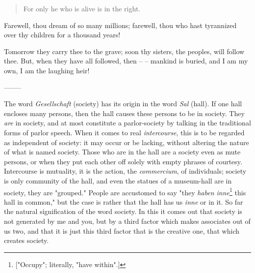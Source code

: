 \documentclass[a4paper]{book}
\begin{document}
\begin{quotation}

\noindent{}For only he who is alive is in the right.\end{quotation}

\noindent{}Farewell, thou dream of so many millions; farewell, thou who hast 
tyrannized over thy children for a thousand years!

Tomorrow they carry thee to the grave; soon thy sisters, the peoples, will 
follow thee. But, when they have all followed, then -- -- mankind is buried, 
and I am my own, I am the laughing heir!

\begin{center}
--------\end{center}


The word \textit{Gesellschaft} (society) has its origin in the word 
\textit{Sal} (hall). If one hall encloses many persons, then the hall causes 
these persons to be in society. They \textit{are} in society, and at most 
constitute a parlor-society by talking in the traditional forms of parlor 
speech. When it comes to real \textit{intercourse}, this is to be regarded as 
independent of society: it may occur or be lacking, without altering the 
nature of what is named society. Those who are in the hall are a society even 
as mute persons, or when they put each other off solely with empty phrases of 
courtesy. Intercourse is mutuality, it is the action, the \textit{commercium}, 
of individuals; society is only community of the hall, and even the statues of 
a museum-hall are in society, they are "{}grouped."{} People are accustomed to 
say "{}they \textit{haben inne}\footnote{["{}Occupy"{}; literally, "{}have 
within"{}.]} this hall in common,"{} but the case is rather that the hall has 
us \textit{inne} or in it. So far the natural signification of the word 
society. In this it comes out that society is not generated by me and you, but 
by a third factor which makes associates out of us two, and that it is just 
this third factor that is the creative one, that which creates society.
\end{document}

